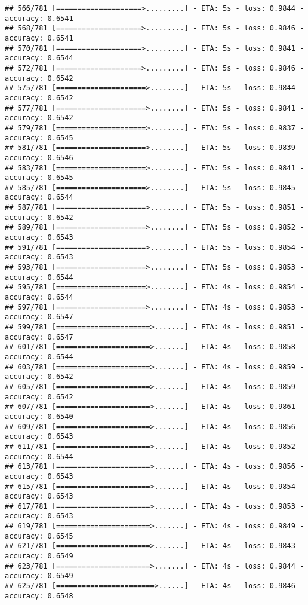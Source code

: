 \documentclass[
]{article}
\begin{document}
\begin{verbatim}
## 566/781 [====================>.........] - ETA: 5s - loss: 0.9844 - accuracy: 0.6541
## 568/781 [====================>.........] - ETA: 5s - loss: 0.9846 - accuracy: 0.6541
## 570/781 [====================>.........] - ETA: 5s - loss: 0.9841 - accuracy: 0.6544
## 572/781 [====================>.........] - ETA: 5s - loss: 0.9846 - accuracy: 0.6542
## 575/781 [=====================>........] - ETA: 5s - loss: 0.9844 - accuracy: 0.6542
## 577/781 [=====================>........] - ETA: 5s - loss: 0.9841 - accuracy: 0.6542
## 579/781 [=====================>........] - ETA: 5s - loss: 0.9837 - accuracy: 0.6545
## 581/781 [=====================>........] - ETA: 5s - loss: 0.9839 - accuracy: 0.6546
## 583/781 [=====================>........] - ETA: 5s - loss: 0.9841 - accuracy: 0.6545
## 585/781 [=====================>........] - ETA: 5s - loss: 0.9845 - accuracy: 0.6544
## 587/781 [=====================>........] - ETA: 5s - loss: 0.9851 - accuracy: 0.6542
## 589/781 [=====================>........] - ETA: 5s - loss: 0.9852 - accuracy: 0.6543
## 591/781 [=====================>........] - ETA: 5s - loss: 0.9854 - accuracy: 0.6543
## 593/781 [=====================>........] - ETA: 5s - loss: 0.9853 - accuracy: 0.6544
## 595/781 [=====================>........] - ETA: 4s - loss: 0.9854 - accuracy: 0.6544
## 597/781 [=====================>........] - ETA: 4s - loss: 0.9853 - accuracy: 0.6547
## 599/781 [======================>.......] - ETA: 4s - loss: 0.9851 - accuracy: 0.6547
## 601/781 [======================>.......] - ETA: 4s - loss: 0.9858 - accuracy: 0.6544
## 603/781 [======================>.......] - ETA: 4s - loss: 0.9859 - accuracy: 0.6542
## 605/781 [======================>.......] - ETA: 4s - loss: 0.9859 - accuracy: 0.6542
## 607/781 [======================>.......] - ETA: 4s - loss: 0.9861 - accuracy: 0.6540
## 609/781 [======================>.......] - ETA: 4s - loss: 0.9856 - accuracy: 0.6543
## 611/781 [======================>.......] - ETA: 4s - loss: 0.9852 - accuracy: 0.6544
## 613/781 [======================>.......] - ETA: 4s - loss: 0.9856 - accuracy: 0.6543
## 615/781 [======================>.......] - ETA: 4s - loss: 0.9854 - accuracy: 0.6543
## 617/781 [======================>.......] - ETA: 4s - loss: 0.9853 - accuracy: 0.6543
## 619/781 [======================>.......] - ETA: 4s - loss: 0.9849 - accuracy: 0.6545
## 621/781 [======================>.......] - ETA: 4s - loss: 0.9843 - accuracy: 0.6549
## 623/781 [======================>.......] - ETA: 4s - loss: 0.9844 - accuracy: 0.6549
## 625/781 [=======================>......] - ETA: 4s - loss: 0.9846 - accuracy: 0.6548

\end{verbatim}
\end{document}
